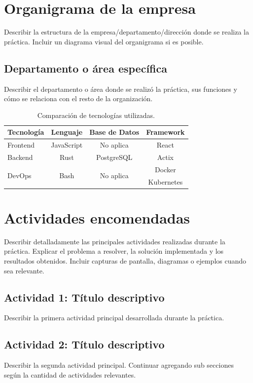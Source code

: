 \documentclass[12pt, a4paper]{article}
\begin{document}
\section{Organigrama de la empresa}
Describir la estructura de la empresa/departamento/dirección donde se realiza la práctica. Incluir un diagrama visual del organigrama si es posible.

\subsection{Departamento o área específica}
Describir el departamento o área donde se realizó la práctica, sus funciones y cómo se relaciona con el resto de la organización.

\begin{table}[h]
    \centering
    \caption{Comparación de tecnologías utilizadas.}
    \label{tab:tech}
    \begin{tabular}{|l|c|c|c|}
        \hline
        Tecnología & Lenguaje & Base de Datos & Framework \\
        \hline
        Frontend & JavaScript & No aplica & React \\
        \hline
        Backend & Rust & PostgreSQL & Actix \\
        \hline
        \multirow{2}{*}{DevOps} & \multirow{2}{*}{Bash} & \multirow{2}{*}{No aplica} & Docker \\
        & & & Kubernetes \\
        \hline
    \end{tabular}
\end{table}

\section{Actividades encomendadas}
Describir detalladamente las principales actividades realizadas durante la práctica. Explicar el problema a resolver, la solución implementada y los resultados obtenidos. Incluir capturas de pantalla, diagramas o ejemplos cuando sea relevante.

\subsection{Actividad 1: Título descriptivo}
Describir la primera actividad principal desarrollada durante la práctica.

\subsection{Actividad 2: Título descriptivo}
Describir la segunda actividad principal. Continuar agregando sub secciones según la cantidad de actividades relevantes.
\end{document}
